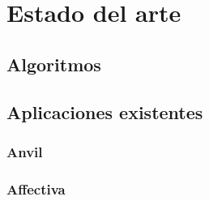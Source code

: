 \chapter{Estado del arte}

\section{Algoritmos}

\section{Aplicaciones existentes}
\subsection{Anvil}
\subsection{Affectiva}
